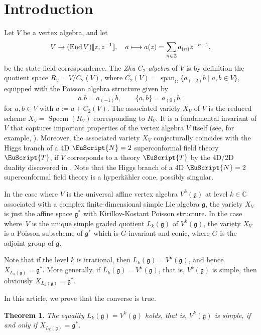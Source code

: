 \documentclass[JEP,XML,SOM,Unicode]{cedram}
\newcommand{\lcr}{[\![}
\newcommand{\rcr}{]\!]}
\newcommand\mto{\mathchoice{\longmapsto}{\mapsto}{\mapsto}{\mapsto}}
\let\mathcal \EuScript
\let\on\operatorname
\let\mc\mathcal
\newcommand\C{{\mathbb C}}
\newcommand\Z{{\mathbb Z}}
\DeclareMathOperator{\End}{End}
\newcommand \g{\mathfrak g}
\newtheorem{theorem}{Theorem}[section]
\theoremstyle{definition}
\begin{document}
\vspace*{-\baselineskip}
\tableofcontents
\mainmatter

\vspace*{-2\baselineskip}\vskip0pt
\section{Introduction}
Let $V$ be a vertex algebra,
and let
\[
V\to (\End V)\lcr z,z^{-1}\rcr,\quad a\mto a(z)=\sum_{n\in \Z}a_{(n)}z^{-n-1},
\]
be the state-field correspondence.
The \emph{Zhu $C_2$-algebra} \cite{Zhu96} of $V$ is by definition the quotient space
$R_V=V/C_2(V)$,
where $C_2(V)=\on{span}_{\C}\{a_{(-2)}b\mid a,b\in V\}$,
equipped with the Poisson algebra structure given by
\[
\bar a. \bar b=\overline{a_{(-1)}b},\qquad \{\bar a,\bar b\}=\overline{a_{(0)}b},
\]
for $a,b \in V$ with $\bar a := a+C_2(V)$.
The associated variety $X_V$ of $V$ is the reduced scheme
$X_V=\on{Specm}(R_V)$
corresponding to $R_V$.
It is a fundamental invariant of $V$ that captures important properties
of the vertex algebra $V$ itself (see, for example, \cite{BeiFeiMaz,Zhu96,AbeBuhDon04,Miy04,Ara12,Ara09b,A2012Dec,AM15,AM16,Arakawa-Kawasetsu}).
Moreover, the associated variety $X_V$
conjecturally \cite{BeeRas} coincides with
the Higgs branch of
a 4D $\mc{N}=2$ superconformal field theory $\mc{T}$,
if $V$ corresponds to a theory $\mc{T}$
by the 4D/2D duality discovered in \cite{BeeLemLie15}.
Note that the Higgs branch of a 4D $\mc{N}=2$ superconformal field theory
is a hyperkähler cone, possibly singular.

In the case where $V$ is
the universal affine vertex algebra $V^k(\g)$ at level $k \in\C$
associated with a complex finite-dimensional simple Lie algebra $\g$,
the variety $X_V$ is just the affine space $\g^*$ with Kirillov-Kostant Poisson structure.
In the case where~$V$ is
the unique simple graded quotient $L_k(\g)$
of $V^k(\g)$,
the variety $X_V$ is a Poisson subscheme of $\g^*$
which is $G$-invariant and conic, where $G$ is the adjoint group of $\g$.

Note that if the level $k$ is irrational,
then
$L_k(\g)=V^k(\g)$,
and hence $X_{L_k(\g)}=\g^*$.
More generally, if $L_k(\g)=V^k(\g)$, that is, $V^k(\g)$
is simple, then obviously
\hbox{$X_{L_k(\g)}=\g^*$.}

In this article, we prove that the converse is true.

\begin{theorem}\label{MainTheorem}
\label{Th:main}
The equality $L_k(\g)=V^k(\g)$ holds, that is,
$V^k(\g)$
is simple, if and only if $X_{L_k(\g)} = \g^*$.
\end{theorem}
\end{document}
